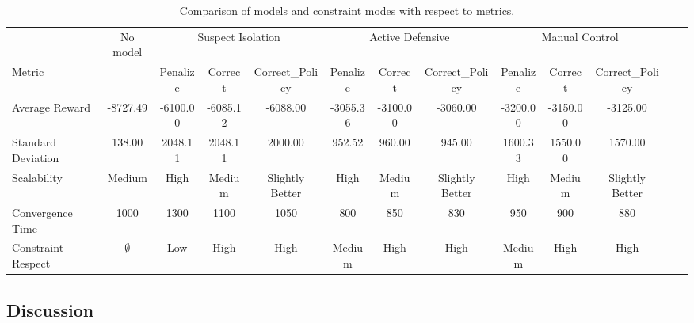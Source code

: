 \documentclass[conference]{IEEEtran}
\begin{document}
\begin{table}[t]
    \centering
    \setlength{\tabcolsep}{4.5pt}
    \caption{Comparison of models and constraint modes with respect to metrics.}
    \label{tab:metrics_comparison}
    \begin{tabular}{lcccccccccccc}
                           & {No model}  & \multicolumn{3}{c}{Suspect Isolation} & \multicolumn{3}{c}{Active Defensive} & \multicolumn{3}{c}{Manual Control}                                                                                 \\
        Metric             &             & Penalize                              & Correct                              & Correct\_Policy                    & Penalize & Correct  & Correct\_Policy & Penalize & Correct  & Correct\_Policy \\
        \midrule
        Average Reward     & -8727.49    & -6100.00                              & -6085.12                             & -6088.00                           & -3055.36 & -3100.00 & -3060.00        & -3200.00 & -3150.00 & -3125.00        \\
        Standard Deviation & 138.00      & 2048.11                               & 2048.11                              & 2000.00                            & 952.52   & 960.00   & 945.00          & 1600.33  & 1550.00  & 1570.00         \\
        Scalability        & Medium      & High                                  & Medium                               & Slightly Better                    & High     & Medium   & Slightly Better & High     & Medium   & Slightly Better \\
        Convergence Time   & 1000        & 1300                                  & 1100                                 & 1050                               & 800      & 850      & 830             & 950      & 900      & 880             \\
        Constraint Respect & $\emptyset$ & Low                                   & High                                 & High                               & Medium   & High     & High            & Medium   & High     & High            \\
    \end{tabular}
\end{table}


\subsection{Discussion}
\end{document}
